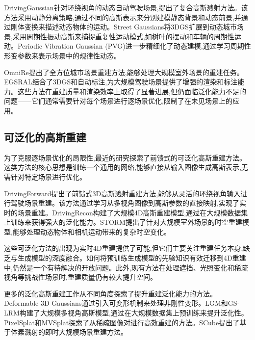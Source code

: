 DrivingGaussian\cite{zhou2024drivinggaussian}针对环绕视角的动态自动驾驶场景,提出了复合高斯溅射方法。该方法采用动静分离策略,通过不同的高斯表示来分别建模静态背景和动态前景,并通过刚体变换来描述动态物体的运动。Street Gaussians将3DGS扩展到动态城市场景,采用周期性振动高斯来捕捉重复性运动模式,如树叶的摆动和车辆的周期性运动\cite{yan2024street,yan2024streetgaussians}。Periodic Vibration Gaussian (PVG)\cite{chen2023pvg,chen2023pvg_arxiv}进一步精细化了动态建模,通过学习周期性形变参数来表示场景中的规律性动态。

OmniRe\cite{chen2024omnire}提出了全方位城市场景重建方法,能够处理大规模室外场景的重建任务。EGSRAL\cite{huo2025egsral}结合了3DGS和自动标注,为大规模驾驶场景提供了增强的渲染和标注能力。这些方法在重建质量和渲染效率上取得了显著进展,但仍面临泛化能力不足的问题——它们通常需要针对每个场景进行逐场景优化,限制了在未见场景上的应用。

\subsection{可泛化的高斯重建}

为了克服逐场景优化的局限性,最近的研究\cite{tian2024drivingforward,lu2024drivingrecon,yang2024storm}探索了前馈式的可泛化高斯重建方法。这类方法的核心思想是训练一个通用的网络,能够直接从输入图像生成高斯表示,无需针对特定场景进行优化。

DrivingForward\cite{tian2024drivingforward}提出了前馈式3D高斯溅射重建方法,能够从灵活的环绕视角输入进行驾驶场景重建。该方法通过学习从多视角图像到高斯参数的直接映射,实现了实时的场景重建。DrivingRecon\cite{lu2024drivingrecon}构建了大规模4D高斯重建模型,通过在大规模数据集上训练来获得强大的泛化能力。STORM\cite{yang2024storm}提出了针对大规模室外场景的时空重建模型,能够处理动态物体和相机运动带来的复杂时空变化。

这些可泛化方法的出现为实时4D重建提供了可能,但它们主要关注重建任务本身,缺乏与生成模型的深度融合。如何将预训练生成模型的先验知识有效迁移到4D重建中,仍然是一个有待解决的开放问题。此外,现有方法在处理遮挡、光照变化和稀疏视角等挑战性场景时,重建质量仍有较大提升空间。

更多的泛化高斯重建工作\cite{yang2023deformable,tang2024lgm,zhang2024gslrm,charatan2024pixelsplat,chen2024mvsplat,ren2024scube}从不同角度探索了提升重建泛化能力的方法。Deformable 3D Gaussians\cite{yang2023deformable}通过引入可变形机制来处理非刚性变形。LGM\cite{tang2024lgm}和GS-LRM\cite{zhang2024gslrm}构建了大规模多视角高斯模型,通过在大规模数据集上预训练来提升泛化性。PixelSplat\cite{charatan2024pixelsplat}和MVSplat\cite{chen2024mvsplat}探索了从稀疏图像对进行高效重建的方法。SCube\cite{ren2024scube}提出了基于体素溅射的即时大规模场景重建方法。

